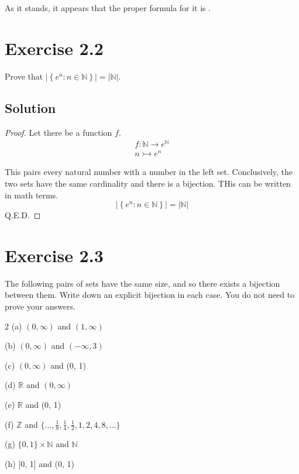 \documentclass[12pt]{report}
\begin{document}
As it stands, it appears that the proper formula for it is . 

\pagebreak
\section{Exercise 2.2}
Prove that $\left|\left\{ e^n : n \in \mathbb{N} \right\}\right| = \left| \mathbb{N} \right|$.

\subsection*{Solution}
\begin{proof}
    Let there be a function $f$.
    \begin{gather}
        f: \mathbb{N} \rightarrow e^\mathbb{N}\\
        n \rightarrowtail e^n
    \end{gather}
    
    This pairs every natural number with a number in the left set.
    Conclusively, the two sets have the same cardinality and there is a bijection.
    THis can be written in math terms.
    \begin{equation}
        \left|\left\{ e^n : n \in \mathbb{N} \right\}\right| = \left| \mathbb{N} \right|
    \end{equation}
    Q.E.D.
\end{proof}

\pagebreak
\section{Exercise 2.3}
The following pairs of sets have the same size, and  so there exists a bijection between them. Write down an explicit  bijection in each case. You do not need to prove your answers.  
\begin{multicols}{2}
    (a) $(0, \infty)$ and $(1, \infty)$ 

    (b) $(0, \infty)$ and $(-\infty, 3)$

    (c) $(0, \infty)$ and (0, 1) 

    (d) $\mathbb{R}$ and $(0, \infty)$  
    \columnbreak

    (e) $\mathbb{R}$ and (0, 1) 
    
    (f) $\mathbb{Z}$ and $\{ ..., \frac{1}{8}, \frac{1}{4}, \frac{1}{2}, 1, 2, 4, 8, ... \}$  
    
    (g) $\{0, 1\} \times \mathbb{N}$ and $\mathbb{N}$  
    
    (h) [0, 1] and (0, 1) 
\end{multicols}
\end{document}
